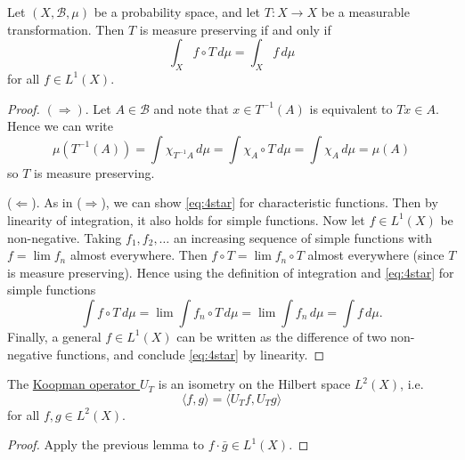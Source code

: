 \documentclass{article}
\begin{document}
\begin{lemma}
  Let $(X, \mathcal{B}, \mu)$ be a probability space, and let $T: X \to X$ be a measurable transformation.
  Then $T$ is measure preserving if and only if
  \begin{equation*}
    \int_X f \circ T \, d\mu = \int_X f \, d\mu \label{eq:4star} \tag{$*$}
  \end{equation*}
  for all $f \in L^1(X)$.
\end{lemma}
\begin{proof}
  $(\Rightarrow)$. Let $A \in \mathcal{B}$ and note that $x \in T^{-1}(A)$ is equivalent to $Tx \in A$.
  Hence we can write
  \begin{equation*}
    \mu(T^{-1}(A))=\int\!\chi_{T^{-1}A}\,d\mu=\int\!\chi_A\circ T\,d\mu=\int\!\chi_A\,d\mu=\mu(A)
  \end{equation*}
  so $T$ is measure preserving.

  ($\Leftarrow$). As in ($\Rightarrow$), we can show \eqref{eq:4star} for characteristic functions.
  Then by linearity of integration, it also holds for simple functions.
  Now let $f \in L^1(X)$ be non-negative. Taking $f_1, f_2, \dotsc$ an increasing sequence of simple functions with $f = \lim f_n$ almost everywhere.
  Then $f \circ T = \lim f_n \circ T$ almost everywhere (since $T$ is measure preserving).
  Hence using the definition of integration and \eqref{eq:4star} for simple functions
  \begin{equation*}
    \int\!f\circ T\,d\mu=\lim\int\!f_n\circ T\,d\mu=\lim\int\!f_n\,d\mu=\int\!f\,d\mu.
  \end{equation*}
  Finally, a general $f \in L^1(X)$ can be written as the difference of two non-negative functions, and conclude \eqref{eq:4star} by linearity.
\end{proof}
\begin{lemma}
  The \hyperlink{def:koopman}{Koopman operator $U_T$} is an isometry on the Hilbert space $L^2(X)$, i.e.
  \begin{equation*}
    \langle f, g \rangle = \langle U_T f, U_T g \rangle
  \end{equation*}
  for all $f,g \in L^2(X)$.
\end{lemma}
\begin{proof}
  Apply the previous lemma to $f \cdot \bar{g} \in L^1(X)$.
\end{proof}
\end{document}

